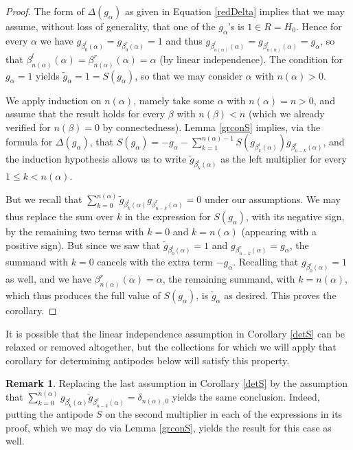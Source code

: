 \documentclass{article}
\theoremstyle{definition}
\newtheorem{rmk}[thm]{Remark}
\begin{document}
\begin{proof}
The form of $\Delta(g_{\alpha})$ as given in Equation \eqref{redDelta} implies that we may assume, without loss of generality, that one of the $g_{\alpha}$'s is $1 \in R=H_{0}$. Hence for every $\alpha$ we have $g_{\beta_{0}^{l}(\alpha)}=g_{\beta_{0}^{r}(\alpha)}=1$ and thus $g_{\beta_{n(\alpha)}^{l}(\alpha)}=g_{\beta_{n(\alpha)}^{r}(\alpha)}=g_{\alpha}$, so that $\beta_{n(\alpha)}^{l}(\alpha)=\beta_{n(\alpha)}^{r}(\alpha)=\alpha$ (by linear independence). The condition for $g_{\alpha}=1$ yields $\tilde{g}_{\alpha}=1=S(g_{\alpha})$, so that we may consider $\alpha$ with $n(\alpha)>0$.

We apply induction on $n(\alpha)$, namely take some $\alpha$ with $n(\alpha)=n>0$, and assume that the result holds for every $\beta$ with $n(\beta)<n$ (which we already verified for $n(\beta)=0$ by connectedness). Lemma \ref{grconS} implies, via the formula for $\Delta(g_{\alpha})$, that $S(g_{\alpha})=-g_{\alpha}-\sum_{k=1}^{n(\alpha)-1}S(g_{\beta_{k}^{l}(\alpha)})g_{\beta_{n-k}^{r}(\alpha)}$, and the induction hypothesis allows us to write $\tilde{g}_{\beta_{k}^{l}(\alpha)}$ as the left multiplier for every $1 \leq k<n(\alpha)$.

But we recall that $\sum_{k=0}^{n(\alpha)}\tilde{g}_{\beta_{k}^{l}(\alpha)}g_{\beta_{n-k}^{r}(\alpha)}=0$ under our assumptions. We may thus replace the sum over $k$ in the expression for $S(g_{\alpha})$, with its negative sign, by the remaining two terms with $k=0$ and $k=n(\alpha)$ (appearing with a positive sign). But since we saw that $\tilde{g}_{\beta_{0}^{l}(\alpha)}=1$ and $g_{\beta_{n-k}^{r}(\alpha)}=g_{\alpha}$, the summand with $k=0$ cancels with the extra term $-g_{\alpha}$. Recalling that $g_{\beta_{0}^{r}(\alpha)}=1$ as well, and we have $\beta_{n(\alpha)}^{r}(\alpha)=\alpha$, the remaining summand, with $k=n(\alpha)$, which thus produces the full value of $S(g_{\alpha})$, is $\tilde{g}_{\alpha}$ as desired. This proves the corollary.
\end{proof}
It is possible that the linear independence assumption in Corollary \ref{detS} can be relaxed or removed altogether, but the collections for which we will apply that corollary for determining antipodes below will satisfy this property.

\begin{rmk}
Replacing the last assumption in Corollary \ref{detS} by the assumption that $\sum_{k=0}^{n(\alpha)}g_{\beta_{k}^{l}(\alpha)}\tilde{g}_{\beta_{n-k}^{r}(\alpha)}=\delta_{n(\alpha),0}$ yields the same conclusion. Indeed, putting the antipode $S$ on the second multiplier in each of the expressions in its proof, which we may do via Lemma \ref{grconS}, yields the result for this case as well. \label{firstS}
\end{rmk}
\end{document}
